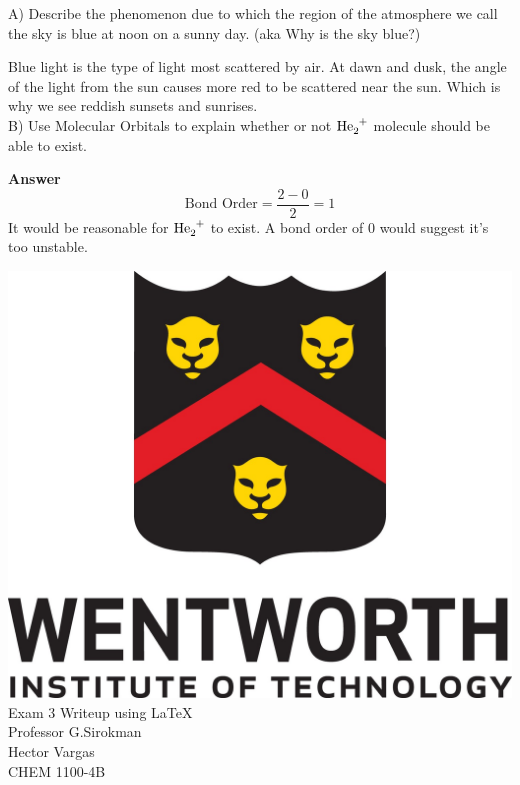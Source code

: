 \documentclass{article}
\begin{document}
    A) Describe the phenomenon due to which the region of the atmosphere we call the sky is blue at noon on a sunny day. (aka Why is the sky blue?)

    Blue light is the type of light most scattered by air. At dawn and dusk, the angle of the light from the sun causes more red to be scattered near the sun. Which is why we see reddish sunsets and sunrises.\\[1cm]

    B) Use Molecular Orbitals to explain whether or not $\ce{He2+}$ molecule should be able to exist.

    \textbf{Answer}\\
    $$\text{Bond Order} = \dfrac{2 - 0}{2} = 1$$
    It would be reasonable for $\ce{He2+}$ to exist. A bond order of 0 would suggest it's too unstable.

    \pagebreak


    \thispagestyle{empty}
    \begin{center}
        \includegraphics[scale=0.3]{wit_logo}\\[1cm]
        Exam 3 Writeup using  \LaTeX\\
        Professor G.Sirokman\\
        Hector Vargas\\
        CHEM 1100-4B
    \end{center}
    \pagebreak
\end{document}
